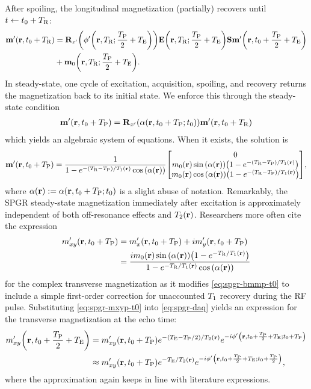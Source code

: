 After spoiling, 
the longitudinal magnetization 
(partially) recovers
until $t \gets t_0+T_\mathrm{R}$:
\begin{align}
	\bmmp\paren{\bmr,t_0+\TR} &= 
	\bmRzp{\php\paren{\bmr,\TR;\frac{\TP}{2}+\TE}} 
	\bmE\paren{\bmr,\TR;\frac{\TP}{2}+\TE} \bmS 
	\bmmp\paren{\bmr,t_0+\frac{\TP}{2}+\TE} \nonumber \\
	&+ \bmmzero\paren{\bmr,\TR;\frac{\TP}{2}+\TE}.
	\label{eq:spgr-pr}
\end{align}
In steady-state, 
one cycle of excitation, acquisition, spoiling, and recovery 
returns the magnetization back to its initial state.
We enforce this through the steady-state condition
\begin{align}
	\bmmp\paren{\bmr,t_0+\TP} = \bmRxp{\flip\prtzt{t_0+\TP}} \bmmp\paren{\bmr,t_0+\TR}
	\label{eq:spgr-ss}
\end{align}
which yields an algebraic
system of equations.
When it exists,
the solution is
\begin{align}
	\bmmp\paren{\bmr,t_0+\TP} = 
	\frac{1}{1-e^{-\paren{\TR-\TP}/\To\pr}\cosa{\alpha\pr}}
	\begin{bmatrix}
		0 \\
		\mzero\pr \sina{\flip\pr} \paren{1-e^{-\paren{\TR-\TP}/\To\pr}}\\
		\mzero\pr \cosa{\flip\pr} \paren{1-e^{-\paren{\TR-\TP}/\To\pr}}
	\end{bmatrix},
	\label{eq:spgr-bmmp-t0}
\end{align}
where $\flip\pr := \flip\prtzt{t_0+\TP}$ 
is a slight abuse of notation.
Remarkably, 
the SPGR steady-state magnetization
immediately after excitation
is approximately independent
of both off-resonance effects
and $\Tt\pr$.
Researchers more often cite the expression
\begin{align}
	\mxyp\paren{\bmr,t_0+\TP}
	&= \mxp\paren{\bmr,t_0+\TP} + i\myp\paren{\bmr,t_0+\TP} \nonumber \\
	&= \frac{i\mzero\pr \sina{\flip\pr} \paren{1-e^{-\TR/\To\pr}}}
	{1-e^{-\TR/\To\pr}\cosa{\alpha\pr}}
	\label{eq:spgr-mxyp-t0}
\end{align}
for the complex transverse magnetization
as it modifies \eqref{eq:spgr-bmmp-t0}
to include a simple first-order correction
for unaccounted $T_1$ recovery during the RF pulse.
Substituting \eqref{eq:spgr-mxyp-t0} 
into \eqref{eq:spgr-daq} 
yields an expression 
for the transverse magnetization
at the echo time:
\begin{align}
	\mxyp\paren{\bmr,t_0+\frac{\TP}{2}+\TE} 
	&=
	\mxyp\paren{\bmr,t_0+\TP} 
	e^{-(\TE-\TP/2)/\Tt\pr} 
	e^{-i\php\paren{\bmr,t_0+\frac{\TP}{2}+\TE;t_0+\TP}} \nonumber \\
	&\approx
	\mxyp\paren{\bmr,t_0+\TP} 
	e^{-\TE/\Tt\pr} 
	e^{-i\php\paren{\bmr,t_0+\frac{\TP}{2}+\TE;t_0+\frac{\TP}{2}}},
	\label{eq:spgr-mxyp-te}
\end{align}
where the approximation
again keeps in line 
with literature expressions.

